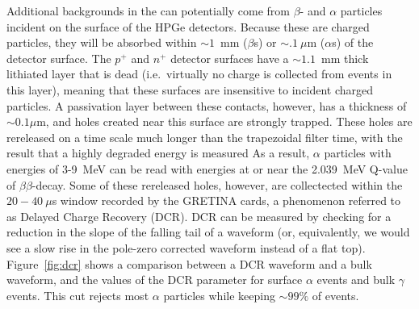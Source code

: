 \documentclass[/main.tex]{subfiles}
\begin{document}
Additional backgrounds in the \MJD can potentially come from $\beta$- and $\alpha$ particles incident on the surface of the HPGe detectors.
Because these are charged particles, they will be absorbed within $\sim1$~mm ($\beta$s) or $\sim.1~\mu$m ($\alpha$s) of the detector surface.
The $p^+$ and $n^+$ detector surfaces have a $\sim1.1$~mm thick lithiated layer that is dead (i.e.~virtually no charge is collected from events in this layer), meaning that these surfaces are insensitive to incident charged particles.
A passivation layer between these contacts, however, has a thickness of $\sim0.1 \mu$m, and holes created near this surface are strongly trapped.
These holes are rereleased on a time scale much longer than the trapezoidal filter time, with the result that a highly degraded energy is measured
As a result, $\alpha$ particles with energies of 3-9~MeV can be read with energies at or near the 2.039~MeV Q-value of $\beta\beta$-decay.
Some of these rereleased holes, however, are collectected within the $20-40~\mu$s window recorded by the GRETINA cards, a phenomenon referred to as Delayed Charge Recovery (DCR).
DCR can be measured by checking for a reduction in the slope of the falling tail of a waveform (or, equivalently, we would see a slow rise in the pole-zero corrected waveform instead of a flat top).
Figure~\ref{fig:dcr} shows a comparison between a DCR waveform and a bulk waveform, and the values of the DCR parameter for surface $\alpha$ events and bulk $\gamma$ events.
This cut rejects most $\alpha$ particles while keeping $\sim99\%$ of \znbb events.
\end{document}
